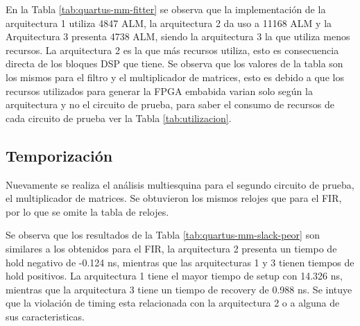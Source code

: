 En la Tabla \ref{tab:quartus-mm-fitter} se observa que la implementación de la arquitectura 1 utiliza 4847 ALM, la arquitectura 2 da uso a 11168 ALM y la Arquitectura 3 presenta 4738 ALM, siendo la arquitectura 3 la que utiliza menos recursos. La arquitectura 2 es la que más recursos utiliza, esto es consecuencia directa de los bloques DSP que tiene. Se observa que los valores de la tabla son los mismos para el filtro y el multiplicador de matrices, esto es debido a que los recursos utilizados para generar la FPGA embabida varian solo según la arquitectura y no el circuito de prueba, para saber el consumo de recursos de cada circuito de prueba ver la Tabla \ref{tab:utilizacion}.

\subsection{Temporización}

Nuevamente se realiza el análisis multiesquina para el segundo circuito de prueba, el multiplicador de matrices. Se obtuvieron los mismos relojes que para el FIR, por lo que se omite la tabla de relojes.

\begin{table}[H]
  \centering
  \caption{Holgura del peor caso en el análisis de temporización multiesquina de Quartus para el multiplicador de matrices. Todos los valores están en nanosegundos.}
  \label{tab:quartus-mm-slack-peor}
\end{table}

Se observa que los resultados de la Tabla \ref{tab:quartus-mm-slack-peor} son similares a los obtenidos para el FIR, la arquitectura 2 presenta un tiempo de hold negativo de -0.124 ns, mientras que las arquitecturas 1 y 3 tienen tiempos de hold positivos. La arquitectura 1 tiene el mayor tiempo de setup con 14.326 ns, mientras que la arquitectura 3 tiene un tiempo de recovery de 0.988 ns. Se intuye que la violación de timing esta relacionada con la arquitectura 2 o a alguna de sus caracteristicas.

